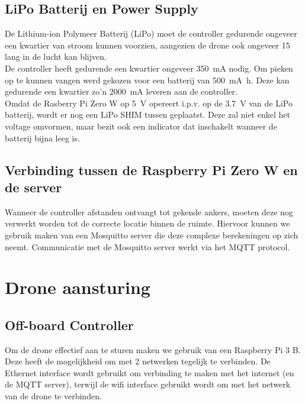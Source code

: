 \subsection{LiPo Batterij en Power Supply} \label{sec:lipo}
De Lithium-ion Polymeer Batterij (LiPo) moet de controller gedurende ongeveer een kwartier van stroom kunnen voorzien, aangezien de drone ook ongeveer \SI{15}{\min} lang in de lucht kan blijven.\\
De controller heeft gedurende een kwartier ongeveer \SI{350}{\mA} nodig.
Om pieken op te kunnen vangen werd gekozen voor een batterij van \SI{500}{\mA\hour}.
Deze kan gedurende een kwartier zo'n \SI{2000}{\mA} leveren aan de controller.\\

Omdat de Rasberry Pi Zero W op \SI{5}{\V} opereert i.p.v. op de \SI{3.7}{\V} van de LiPo batterij, wordt er nog een LiPo SHIM tussen geplaatst. Deze zal niet enkel het voltage omvormen, maar bezit ook een indicator dat inschakelt wanneer de batterij bijna leeg is.

\subsection{Verbinding tussen de Raspberry Pi Zero W en de server} \label{sec:raspberry_server}
Wanneer de controller afstanden ontvangt tot gekende ankers, moeten deze nog verwerkt worden tot de correcte locatie binnen de ruimte.
Hiervoor kunnen we gebruik maken van een Mosquitto server die deze complexe berekeningen op zich neemt.
Communicatie met de Mosquitto server werkt via het MQTT protocol.

\section{Drone aansturing} \label{sec:drone_control}
\subsection{Off-board Controller} \label{sec:offboard_controller}
Om de drone effectief aan te sturen maken we gebruik van een Raspberry Pi 3 B.
Deze heeft de mogelijkheid om met 2 netwerken tegelijk te verbinden. De Ethernet interface wordt gebruikt om verbinding te maken met het internet (en de MQTT server), terwijl de wifi interface gebruikt wordt om met het netwerk van de drone te verbinden.\\

